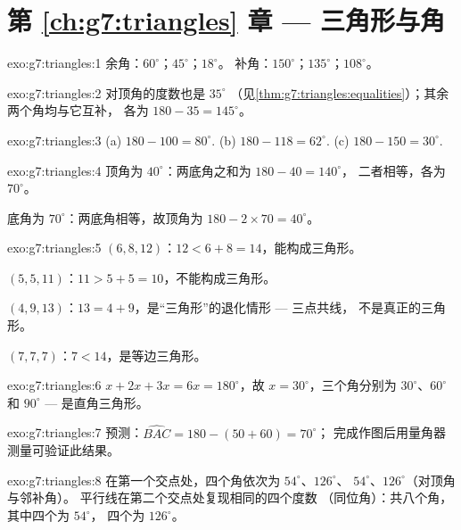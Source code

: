 \section*{第 \ref{ch:g7:triangles} 章 --- 三角形与角}

\begin{solution}{exo:g7:triangles:1}
余角：$60^\circ$；$45^\circ$；$18^\circ$。
补角：$150^\circ$；$135^\circ$；$108^\circ$。
\end{solution}

\begin{solution}{exo:g7:triangles:2}
对顶角的度数也是 $35^\circ$
（见\cref{thm:g7:triangles:equalities}）；其余两个角均与它互补，
各为 $180 - 35 = 145^\circ$。
\end{solution}

\begin{solution}{exo:g7:triangles:3}
(a) $180 - 100 = 80^\circ$. \quad
(b) $180 - 118 = 62^\circ$. \quad
(c) $180 - 150 = 30^\circ$.
\end{solution}

\begin{solution}{exo:g7:triangles:4}
顶角为 $40^\circ$：两底角之和为 $180 - 40 = 140^\circ$，
二者相等，各为 $70^\circ$。

底角为 $70^\circ$：两底角相等，故顶角为
$180 - 2 \times 70 = 40^\circ$。
\end{solution}

\begin{solution}{exo:g7:triangles:5}
$(6, 8, 12)$：$12 < 6 + 8 = 14$，能构成三角形。

$(5, 5, 11)$：$11 > 5 + 5 = 10$，不能构成三角形。

$(4, 9, 13)$：$13 = 4 + 9$，是“三角形”的退化情形 --- 三点共线，
不是真正的三角形。

$(7, 7, 7)$：$7 < 14$，是等边三角形。
\end{solution}

\begin{solution}{exo:g7:triangles:6}
$x + 2x + 3x = 6x = 180^\circ$，故 $x = 30^\circ$，三个角分别为
$30^\circ$、$60^\circ$ 和 $90^\circ$ --- 是直角三角形。
\end{solution}

\begin{solution}{exo:g7:triangles:7}
预测：$\widehat{BAC} = 180 - (50 + 60) = 70^\circ$；
完成作图后用量角器测量可验证此结果。
\end{solution}

\begin{solution}{exo:g7:triangles:8}
在第一个交点处，四个角依次为 $54^\circ$、$126^\circ$、
$54^\circ$、$126^\circ$（对顶角与邻补角）。
平行线在第二个交点处复现相同的四个度数
（同位角）：共八个角，其中四个为 $54^\circ$，
四个为 $126^\circ$。
\end{solution}


